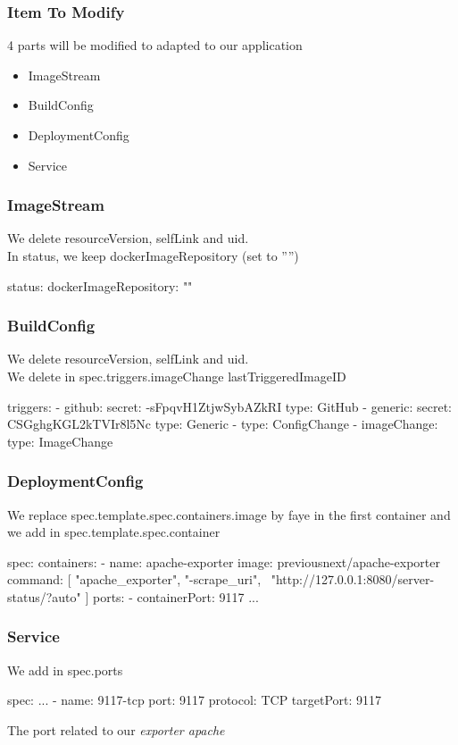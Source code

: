 \begin{frame}[fragile]
  \frametitle{Item To Modify}
  4 parts will be modified to adapted to our application
  \begin{itemize}
  \item ImageStream
  \item BuildConfig
  \item DeploymentConfig
  \item Service
  \end{itemize}
\end{frame}

\begin{frame}[fragile]
  \frametitle{ImageStream}
  We delete resourceVersion, selfLink and uid. \\
  In status, we keep dockerImageRepository (set to ””)
  \begin{yamlcode}
    status:
    dockerImageRepository: ""
  \end{yamlcode}
\end{frame}

\begin{frame}[fragile]
  \frametitle{BuildConfig}
  We delete resourceVersion, selfLink and uid. \\
  We delete in spec.triggers.imageChange lastTriggeredImageID
  \begin{yamlcode}
    triggers:
    - github:
        secret: -sFpqvH1ZtjwSybAZkRI
      type: GitHub
    - generic:
      secret: CSGghgKGL2kTVIr8l5Nc
      type: Generic
    - type: ConfigChange
    - imageChange:
      type: ImageChange
  \end{yamlcode}
\end{frame}

\begin{frame}[fragile]
  \frametitle{DeploymentConfig}
  We replace spec.template.spec.containers.image by faye in the first container and we add in spec.template.spec.container
  \begin{yamlcode}
    spec:
      containers:
      - name: apache-exporter
        image: previousnext/apache-exporter
        command: [ "apache_exporter", "-scrape_uri", \
        "http://127.0.0.1:8080/server-status/?auto" ]
        ports:
        - containerPort: 9117
      ...
  \end{yamlcode}
\end{frame}

\begin{frame}[fragile]
  \frametitle{Service}
  We add in spec.ports
  \begin{yamlcode}
    spec:
      ...
      - name: 9117-tcp
        port: 9117
        protocol: TCP
        targetPort: 9117
  \end{yamlcode}
  The port related to our \emph{exporter apache}
\end{frame}

